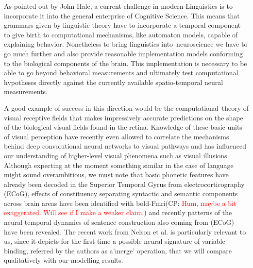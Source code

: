 \documentclass[10pt]{article}
\newcommand{\noteCP}[1]{(CP: \textcolor{red}{#1})}
\begin{document}
{\label{619233}}

As pointed out by John Hale\cite{hale2014automaton}, a current challenge in modern
Linguistics is to incorporate it into the general enterprise of Cognitive
Science. This means that grammars given by linguistic theory have to
incorporate a temporal component to give birth to computational
mechanisms, like automaton models, capable of explaining behavior.
Nonetheless to bring linguistics
into~neuroscience we have to go much further and also provide reasonable
implementation models conforming to the biological components of the
brain. This implementation is necessary to be able to go beyond
behavioral measurements and ultimately test computational hypotheses
directly against the currently available spatio-temporal neural measurements.

A good example of success in this direction would be the
computational~theory of visual receptive fields\cite{lindeberg2017normative} that
makes impressively accurate predictions on the shape of the biological
visual fields found in the retina. Knowledge of these basic units of
visual perception have recently even allowed to correlate the mechanisms
behind deep convolutional neural networks to visual
pathways\cite{Guclu_2015,Eickenberg_2017} and has influenced our understanding of
higher-level visual phenomena such as visual illusions\cite{Eagleman_2001}.
Although expecting at the moment something similar in the case of
language might sound overambitious, we must note that basic phonetic
features have already been decoded in the Superior Temporal Gyrus from
electrocorticography (ECoG)\cite{Mesgarani_2014}, effects of constituency
separating syntactic and semantic components across brain areas have
been identified with bold-Fmri\cite{Pallier_2011}\noteCP{Hum, maybe a bit exaggerated. Will see if I make a weaker claim.} and recently patterns
of the neural temporal dynamics of sentence construction also coming
from (ECoG) have been revealed\cite{Fedorenko_2016,Nelson_2017}. The recent work from
Nelson et al.\cite{Nelson_2017} is particularly relevant to us, since
it depicts for the first time a possible neural signature of variable
binding, referred by the authors as a'merge' operation, that we will compare
qualitatively with our modelling results.
\end{document}

